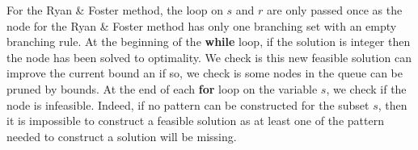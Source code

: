 For the Ryan \& Foster method, the loop on $s$ and $r$ are only passed once as the node for the Ryan \& Foster method has only one branching set with an empty branching rule. At the beginning of the \textbf{while} loop, if the solution is integer then the node has been solved to optimality. We check is this new feasible solution can improve the current bound an if so, we check is some nodes in the queue can be pruned by bounds. At the end of each \textbf{for} loop on the variable $s$, we check if the node is infeasible. Indeed, if no pattern can be constructed for the subset $s$, then it is impossible to construct a feasible solution as at least one of the pattern needed to construct a solution will be missing.
